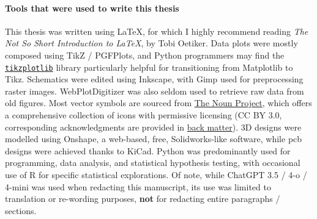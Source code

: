 \vfill

\setcounter{secnumdepth}{3}

\paragraph{Tools that were used to write this thesis} \hphantom{text}

This thesis was written using \LaTeX{}, for which I highly recommend reading \emph{The Not So Short Introduction to \LaTeX}, by Tobi Oetiker\cite{oetiker2007}. Data plots were mostly composed using TikZ / PGFPlots, and Python programmers may find the \href{https://web.archive.org/web/20240506065201/https://pypi.org/project/tikzplotlib/}{\texttt{tikzplotlib}} library particularly helpful for transitioning from Matplotlib to Tikz. Schematics were edited using Inkscape, with Gimp used for preprocessing raster images. WebPlotDigitizer was also seldom used to retrieve raw data from old figures. Most vector symbols are sourced from \href{https://web.archive.org/web/20240505215016/https://thenounproject.com/}{The Noun Project}, which offers a comprehensive collection of icons with permissive licensing (CC BY 3.0, corresponding acknowledgments are provided in \hyperref[chap:add_ack]{back matter}). 3D designs were modelled using Onshape, a web-based, free, Solidworks-like software, while \gls{pcb} designs were achieved thanks to KiCad. Python was predominantly used for programming, data analysis, and statistical hypothesis testing, with occasional use of R for specific statistical explorations. Of note, while ChatGPT 3.5 / 4-o / 4-mini was used when redacting this manuscript, its use was limited to translation or re-wording purposes, \textbf{not} for redacting entire paragraphs / sections.

\setcounter{secnumdepth}{4}